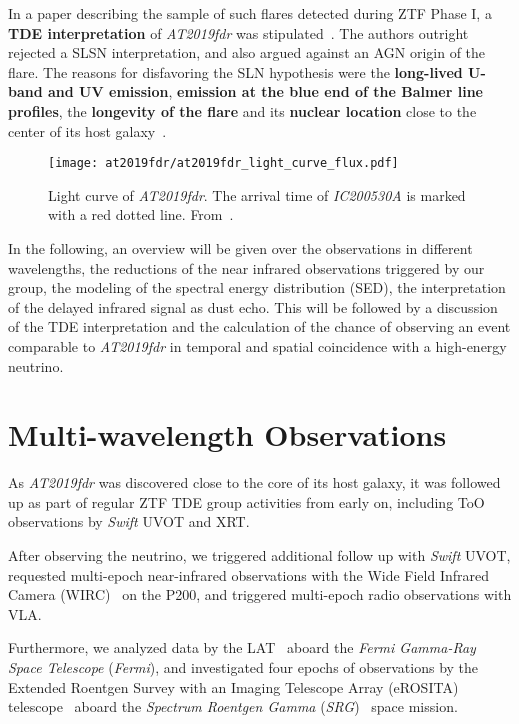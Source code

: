 In a paper describing the sample of such flares detected during ZTF Phase I, a \textbf{TDE interpretation} of \emph{AT2019fdr} was stipulated~\cite{Frederick2021}. The authors outright rejected a SLSN interpretation, and also argued against an AGN origin of the flare. The reasons for disfavoring the SLN hypothesis were the \textbf{long-lived U-band and UV emission}, \textbf{emission at the blue end of the Balmer line profiles}, the \textbf{longevity of the flare} and its \textbf{nuclear location} close to the center of its host galaxy~\cite{Frederick2021}.

\begin{figure*}[htb]
    \texttt{[image: at2019fdr/at2019fdr\_light\_curve\_flux.pdf]}
    \caption[\emph{AT2019fdr} light curve]{Light curve of \emph{AT2019fdr}. The arrival time of \emph{IC200530A} is marked with a red dotted line. From~\cite{Reusch2022}.}
\end{figure*}

In the following, an overview will be given over the observations in different wavelengths, the reductions of the near infrared observations triggered by our group, the modeling of the spectral energy distribution (SED), the interpretation of the delayed infrared signal as dust echo. This will be followed by a discussion of the TDE interpretation and the calculation of the chance of observing an event comparable to \emph{AT2019fdr} in temporal and spatial coincidence with a high-energy neutrino.

\section{Multi-wavelength Observations}
As \emph{AT2019fdr} was discovered close to the core of its host galaxy, it was followed up as part of regular ZTF TDE group activities from early on, including ToO observations by \textit{Swift} UVOT and XRT.

After observing the neutrino, we triggered additional follow up with \textit{Swift} UVOT, requested multi-epoch near-infrared observations with the Wide Field Infrared Camera (WIRC)~ on the P200, and triggered multi-epoch radio observations with VLA.

Furthermore, we analyzed data by the LAT~\cite{Atwood2009} aboard the \textit{Fermi Gamma-Ray Space Telescope} (\textit{Fermi}), and investigated four epochs of observations by the Extended Roentgen Survey with an Imaging Telescope Array (eROSITA) telescope~ aboard the \textit{Spectrum Roentgen Gamma} (\textit{SRG})~ space mission.

